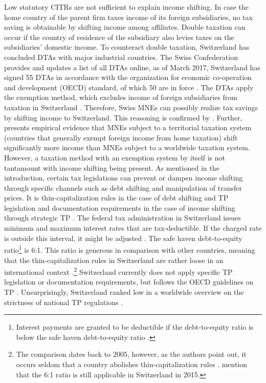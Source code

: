 \documentclass[10pt,twocolumn,oneside,cmyk]{article}
\begin{document}
Low statutory CITRs are not sufficient to explain income shifting. In case the home country
of the parent firm taxes income of its foreign subsidiaries, no tax saving is obtainable by shifting income among affiliates. Double taxation can occur if the country of residence of the subsidiary also levies taxes on the subsidiaries' domestic income. To counteract double taxation,
Switzerland has concluded DTAs with major industrial countries. The Swiss Confederation
provides and updates a list of all DTAs online, as of March 2017, Switzerland has signed 55
DTAs in accordance with the organization for economic co-operation and development
(OECD) standard, of which 50 are in force \parencite{swiss_confederation_double_2017}. The DTAs apply the exemption method, which excludes income of foreign subsidiaries from taxation in Switzerland \parencites[121]{swiss_global_enterprise_handbook_2016}[36-37]{oecd_model_2014}. Therefore, Swiss MNEs can possibly realize tax savings by shifting income to Switzerland. This reasoning is confirmed by \textcite[16]{heckemeyer_multinationals_2013}. Further, \textcite[8-9, 32-33]{markle_comparison_2016} presents empirical evidence that MNEs subject to a territorial taxation system (countries that generally exempt foreign income from home taxation) shift significantly more income than MNEs subject to a worldwide taxation system. However, a taxation method with an exemption system by itself is not tantamount with income shifting being present. As mentioned in the introduction, certain tax legislations can prevent or dampen income shifting through specific channels such as debt shifting and manipulation of transfer prices. It is thin-capitalization rules in the case of debt shifting \parencite[13-14]{buettner_anti_2017} and TP legislation and documentation requirements in the case of income shifting through strategic TP \parencite[15]{lohse_impact_2012}. The federal tax administration in Switzerland issues minimum and maximum interest rates that are tax-deductible. If the charged rate is outside this interval, it might be adjusted \parencite[963]{pwc_international_2015}. The safe haven debt-to-equity ratio\footnote{Interest payments are granted to be deductible if the debt-to-equity ratio is below the safe haven debt-to-equity ratio \parencite[931]{buettner_impact_2012}.} is 6:1. This ratio is generous in comparison with other countries, meaning that the thin-capitalization rules in Switzerland are rather loose in an international context \parencite[932]{buettner_impact_2012}.\footnote{The comparison dates back to 2005, however, as the authors point out, it occurs seldom that a country abolishes thin-capitalization rules \parencite[932]{buettner_impact_2012}. \textcite[963]{pwc_international_2015} mention that the 6:1 ratio is still applicable in Switzerland in 2015.} Switzerland currently does not apply specific TP legislation or documentation requirements, but follows the OECD guidelines on TP \parencite[962, 964]{pwc_international_2015}. Unsurprisingly, Switzerland ranked low in a worldwide overview on the strictness of national TP regulations \parencite[23-24]{lohse_increasing_2012}.
\end{document}
